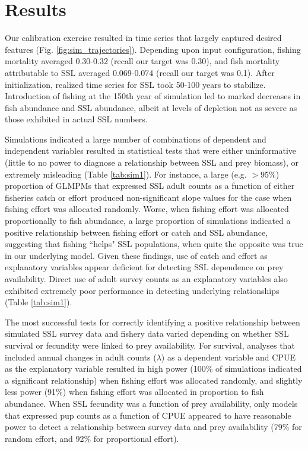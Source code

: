 \documentclass[11pt]{article}
\begin{document}
\section{Results}

Our calibration exercise resulted in time series that largely captured desired features (Fig. \ref{fig:sim_trajectories}).  Depending upon input configuration, fishing mortality averaged 0.30-0.32 (recall our target was 0.30), and fish mortality attributable to SSL averaged 0.069-0.074 (recall our target was 0.1).  After initialization, realized time series for SSL took 50-100 years to stabilize.  Introduction of fishing at the 150th year of simulation led to marked decreases in fish abundance and SSL abundance, albeit at levels of depletion not as severe as those exhibited in actual SSL numbers.

Simulations indicated a large number of combinations of dependent and independent variables resulted in statistical tests that were either uninformative (little to no power to diagnose a relationship between SSL and prey biomass), or extremely misleading (Table \ref{tab:sim1}).  For instance, a large (e.g. $>95\%$) proportion of GLMPMs that expressed SSL adult counts as a function of either fisheries catch or effort produced non-significant slope values for the case when fishing effort was allocated randomly.  Worse, when fishing effort was allocated proportionally to fish abundance, a large proportion of simulations indicated a positive relationship between fishing effort or catch and SSL abundance, suggesting that fishing ``helps" SSL populations, when quite the opposite was true in our underlying model.  Given these findings, use of catch and effort as explanatory variables appear deficient for detecting SSL dependence on prey availability.  Direct use of adult survey counts as an explanatory variables also exhibited extremely poor performance in detecting underlying relationships (Table \ref{tab:sim1}).

The most successful tests for correctly identifying a positive relationship between simulated SSL survey data and fishery data varied depending on whether SSL survival or fecundity were linked to prey availability.  For survival, analyses that included annual changes in adult counts ($\lambda$) as a dependent variable and CPUE as the explanatory variable resulted in high power (100\% of simulations indicated a significant relationship) when fishing effort was allocated randomly, and slightly less power (91\%) when fishing effort was allocated in proportion to fish abundance. When SSL fecundity was a function of prey availability, only models that expressed pup counts as a function of CPUE appeared to have reasonable power to detect a relationship between survey data and prey availability (79\% for random effort, and 92\% for proportional effort).
\end{document}
